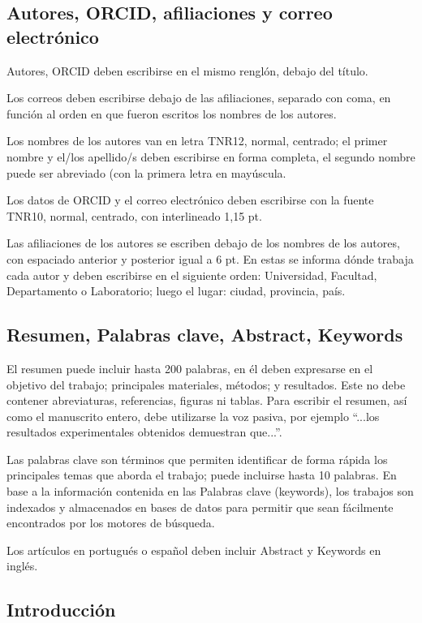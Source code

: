 \documentclass[a4paper, 12pt]{article}
\begin{document}
\subsection{Autores, ORCID, afiliaciones y correo electrónico}

Autores, ORCID deben escribirse en el mismo renglón, debajo del título.

Los correos deben escribirse debajo de las afiliaciones, separado con coma, en
función al orden en que fueron escritos los nombres de los autores.

Los nombres de los autores van en letra TNR12, normal, centrado; el primer
nombre y el/los apellido/s deben escribirse en forma completa, el segundo nombre
puede ser abreviado (con la primera letra en mayúscula.

Los datos de ORCID y el correo electrónico deben escribirse con la fuente TNR10,
normal, centrado, con interlineado 1,15 pt.

Las afiliaciones de los autores se escriben debajo de los nombres de los
autores, con espaciado anterior y posterior igual a 6 pt. En estas se informa
dónde trabaja cada autor y deben escribirse en el siguiente orden: Universidad,
Facultad, Departamento o Laboratorio; luego el lugar: ciudad, provincia, país.

\subsection{Resumen, Palabras clave, Abstract, Keywords}

El resumen puede incluir hasta 200 palabras, en él deben expresarse en el
objetivo del trabajo; principales materiales, métodos; y resultados. Este no
debe contener abreviaturas, referencias, figuras ni tablas. Para escribir el
resumen, así como el manuscrito entero, debe utilizarse la voz pasiva, por
ejemplo “...los resultados experimentales obtenidos demuestran que...”.

Las palabras clave son términos que permiten identificar de forma rápida los
principales temas que aborda el trabajo; puede incluirse hasta 10 palabras. En
base a la información contenida en las Palabras clave (keywords), los trabajos
son indexados y almacenados en bases de datos para permitir que sean fácilmente
encontrados por los motores de búsqueda.

Los artículos en portugués o español deben incluir Abstract y Keywords en
inglés.

\subsection{Introducción}
\end{document}
